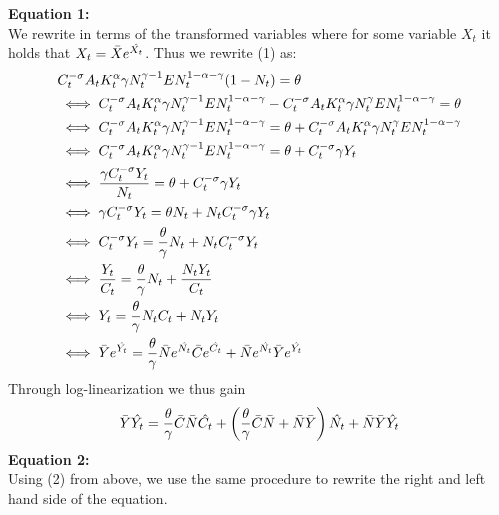 \documentclass[a4paper,11pt]{article}
\begin{document}
\textbf{Equation 1:}\\
We rewrite in terms of the transformed variables where for some variable $X_t$ it holds that $X_t = \Bar{X}e^{\hat{X_t}}$. Thus we rewrite (1) as:\\
\begin{align*}
    & C_t^{-\sigma}A_tK_t^\alpha \gamma N_t^{\gamma-1} EN_t^{1-\alpha-\gamma}(1-N_t)=\theta\\
    & \iff C_t^{-\sigma}A_tK_t^\alpha \gamma N_t^{\gamma-1} EN_t^{1-\alpha-\gamma} - C_t^{-\sigma}A_tK_t^\alpha \gamma N_t^{\gamma} EN_t^{1-\alpha-\gamma} =\theta\\
    & \iff C_t^{-\sigma}A_tK_t^\alpha \gamma N_t^{\gamma-1} EN_t^{1-\alpha-\gamma} =\theta + C_t^{-\sigma}A_tK_t^\alpha \gamma N_t^{\gamma} EN_t^{1-\alpha-\gamma}\\
    & \iff C_t^{-\sigma}A_tK_t^\alpha \gamma N_t^{\gamma-1} EN_t^{1-\alpha-\gamma} =\theta + C_t^{-\sigma}\gamma Y_t\\
    & \iff \frac{\gamma C_t^{-\sigma} Y_t}{N_t} =\theta + C_t^{-\sigma}\gamma Y_t\\
    & \iff \gamma C_t^{-\sigma} Y_t =\theta N_t + N_t C_t^{-\sigma}\gamma Y_t\\
    & \iff C_t^{-\sigma} Y_t =\frac{\theta}{\gamma} N_t + N_t C_t^{-\sigma} Y_t\\
    &\iff \frac{Y_t}{C_t} = \frac{\theta}{\gamma}N_t + \frac{N_t Y_t}{C_t}\\
    &\iff Y_t = \frac{\theta}{\gamma}N_tC_t + N_t Y_t\\
    &\iff \Bar{Y}e^{\hat{Y_t}} = \frac{\theta}{\gamma}\Bar{N}e^{\hat{N_t}}\Bar{C}e^{\hat{C_t}} + \Bar{N}e^{\hat{N_t}} \Bar{Y}e^{\hat{Y_t}}\\
\end{align*}
Through log-linearization we thus gain
$$\Bar{Y}\hat{Y_t}= \frac{\theta}{\gamma} \Bar{C}\Bar{N}\hat{C_t} + \left(\frac{\theta}{\gamma}\Bar{C}\Bar{N} + \Bar{N}\Bar{Y}\right)\hat{N_t} + \Bar{N}\Bar{Y}\hat{Y_t}$$
\textbf{Equation 2:}\\
Using (2) from above, we use the same procedure to rewrite the right and left hand side of the equation. 
\end{document}
